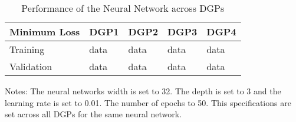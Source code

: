 

\begin{table}[]
\centering
\begin{threeparttable}
\caption{Performance of the Neural Network across DGPs}
\label{tab:table2}
\begin{tabular}{@{}lllll@{}}
\toprule
\addlinespace
Minimum Loss                & DGP1 & DGP2 & DGP3 & DGP4 \\ \midrule
Training    & data & data & data & data \\
Validation  & data & data & data & data \\ \bottomrule
\end{tabular}
\begin{tablenotes}
    \item Notes: The neural networks width is set to 32. The depth is set to 3 and the learning rate is set to 0.01. The number of epochs to 50. This specifications are set across all DGPs for the same neural network.
\end{tablenotes}
\end{threeparttable}
\end{table}
